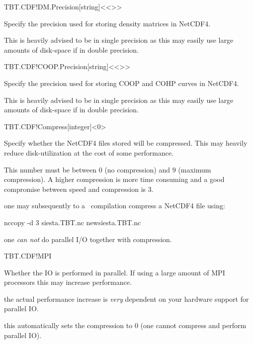 \begin{fdfentry}{TBT.CDF!DM.Precision}[string]<{<>}>

  Specify the precision used for storing density matrices in NetCDF4.

  \note This is heavily advised to be in single precision as this may
  easily use large amounts of disk-space if in double precision.
  
\end{fdfentry}

\begin{fdfentry}{TBT.CDF!COOP.Precision}[string]<{<>}>

  Specify the precision used for storing COOP and COHP curves in NetCDF4.

  \note This is heavily advised to be in single precision as this may
  easily use large amounts of disk-space if in double precision.
  
\end{fdfentry}

\begin{fdfentry}{TBT.CDF!Compress}[integer]<0>

  Specify whether the NetCDF4 files stored will be compressed. This
  may heavily reduce disk-utilization at the cost of some performance.

  This number must be between 0 (no compression) and 9 (maximum
  compression). A higher compression is more time consuming and a good
  compromise between speed and compression is 3.

  \note one may subsequently to a \tbtrans\ compilation compress a
  NetCDF4 file using:
\begin{shellexample}
   nccopy -d 3 siesta.TBT.nc newsiesta.TBT.nc
 \end{shellexample}

 \note one \emph{can not} do parallel I/O together with compression.
  
\end{fdfentry}

\begin{fdflogicalF}{TBT.CDF!MPI}

  Whether the IO is performed in parallel. If using a large amount of
  MPI processors this may increase performance.

  \note the actual performance increase is \emph{very} dependent on
  your hardware support for parallel IO.

  \note this automatically sets the compression to 0 (one cannot
  compress and perform parallel IO).

\end{fdflogicalF}

